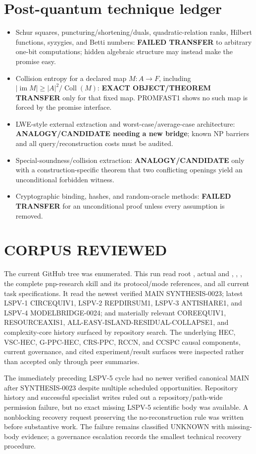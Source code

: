 \documentclass[11pt]{article}
\begin{document}
\section{Post-quantum technique ledger}
\begin{itemize}[leftmargin=*]
\item Schur squares, puncturing/shortening/duals, quadratic-relation ranks,
Hilbert functions, syzygies, and Betti numbers: \textbf{FAILED TRANSFER} to
arbitrary one-bit computations; hidden algebraic structure may instead make
the promise easy.
\item Collision entropy for a declared map $M:A\to F$, including
$|\operatorname{im}M|\ge |A|^2/\operatorname{Coll}(M)$:
\textbf{EXACT OBJECT/THEOREM TRANSFER} only for that fixed map.  PROMFAST1
shows no such map is forced by the promise interface.
\item LWE-style external extraction and worst-case/average-case architecture:
\textbf{ANALOGY/CANDIDATE needing a new bridge}; known NP barriers and all
query/reconstruction costs must be audited.
\item Special-soundness/collision extraction:
\textbf{ANALOGY/CANDIDATE} only with a construction-specific theorem that two
conflicting openings yield an unconditional forbidden witness.
\item Cryptographic binding, hashes, and random-oracle methods:
\textbf{FAILED TRANSFER} for an unconditional proof unless every assumption
is removed.
\end{itemize}

\section{CORPUS REVIEWED}
The current GitHub tree was enumerated.  This run read root
, actual  and ,
, , the complete pnp-research skill and its
protocol/mode references, and all current task specifications.  It read the
newest verified MAIN SYNTHESIS-0023; latest LSPV-1 CIRCEQUIV1, LSPV-2
REPDIRSUM1, LSPV-3 ANTISHARE1, and LSPV-4 MODELBRIDGE-0024; and materially
relevant COREEQUIV1, RESOURCEAXIS1, ALL-EASY-ISLAND-RESIDUAL-COLLAPSE1, and
complexity-core history surfaced by repository search.  The underlying
HEC, VSC-HEC, G-PPC-HEC, CRS-PPC, RCCN, and CCSPC causal components, current
governance, and cited experiment/result surfaces were inspected rather than
accepted only through peer summaries.

The immediately preceding LSPV-5 cycle had no newer verified canonical MAIN
after SYNTHESIS-0023 despite multiple scheduled opportunities.  Repository
history and successful specialist writes ruled out a repository/path-wide
permission failure, but no exact missing LSPV-5 scientific body was available.
A nonblocking recovery request preserving the no-reconstruction rule was
written before substantive work.  The failure remains classified UNKNOWN
with missing-body evidence; a governance escalation records the smallest
technical recovery procedure.
\end{document}

